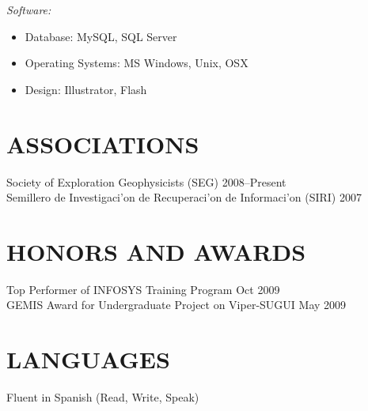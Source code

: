 \documentclass[line,margin]{res}
\begin{document}
\begin{resume}
    {\sl Software:}
    \begin{itemize} \itemsep -2pt
        \item Database: MySQL, SQL Server
        \item Operating Systems: MS Windows, Unix, OSX
        \item Design: Illustrator, Flash
    \end{itemize} 

\section{ASSOCIATIONS} %
\label{sec:associations}
    Society of Exploration Geophysicists (SEG) \hfill 2008--Present\\
    Semillero de Investigaci\a'on de Recuperaci\a'on de Informaci\a'on (SIRI) \hfill 2007\\

\section{HONORS AND AWARDS} %
\label{sec:honors_and_awards}
    Top Performer of INFOSYS Training Program \hfill Oct 2009\\
    GEMIS Award for Undergraduate Project on Viper-SUGUI \hfill May 2009\\

\section{LANGUAGES} %
\label{sec:languages}
    Fluent in Spanish (Read, Write, Speak)

\end{resume}
\end{document}
